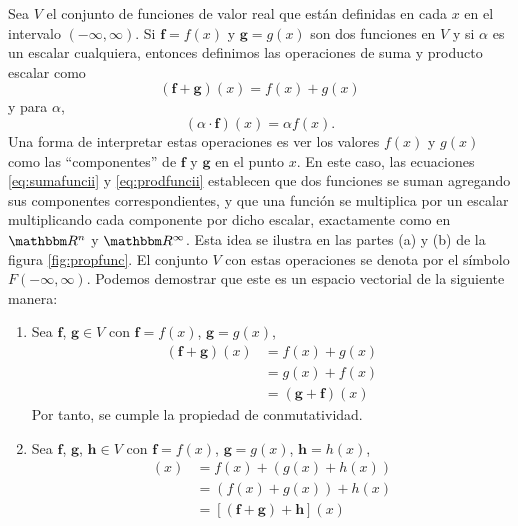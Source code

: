 \begin{examplebox}{}{}
    Sea $V$ el conjunto de funciones de valor real que están definidas en cada $x$ en el intervalo $(-\infty, \infty)$. Si $\mathbf{f} = f(x)$ y $\mathbf{g} = g(x)$ son dos funciones en $V$ y si $\alpha$ es un escalar cualquiera, entonces definimos las operaciones de suma y producto escalar como
    \begin{equation}
        (\mathbf{f} + \mathbf{g})(x) = f(x) + g(x) \label{eq:sumafuncii}
    \end{equation}
    y para $\alpha$,
    \begin{equation}
        (\alpha \cdot \mathbf{f})(x) = \alpha f(x). \label{eq:prodfuncii}
    \end{equation}
    Una forma de interpretar estas operaciones es ver los valores $f(x)$ y $g(x)$ como las “componentes” de $\mathbf{f}$ y $\mathbf{g}$ en el punto $x$. En este caso, las ecuaciones \eqref{eq:sumafuncii} y \eqref{eq:prodfuncii} establecen que dos funciones se suman agregando sus componentes correspondientes, y que una función se multiplica por un escalar multiplicando cada componente por dicho escalar, exactamente como en $\RR[n]$ y $\RR[\infty]$. Esta idea se ilustra en las partes (a) y (b) de la figura \ref{fig:propfunc}. El conjunto $V$ con estas operaciones se denota por el símbolo $F(-\infty, \infty)$. Podemos demostrar que este es un espacio vectorial de la siguiente manera:
    \begin{enumerate}[label=\roman*), topsep=6pt, itemsep=0pt]
        \item Sea $\mathbf{f}$, $\mathbf{g} \in V$ con $\mathbf{f} = f(x)$, $\mathbf{g} = g(x)$,
        \begin{align*}
            (\mathbf{f} + \mathbf{g})(x) & = f(x) + g(x) \\
            & = g(x) + f(x) \\
            & = (\mathbf{g} + \mathbf{f})(x)
        \end{align*}
        Por tanto, se cumple la propiedad de conmutatividad.
        \item Sea $\mathbf{f}$, $\mathbf{g}$, $\mathbf{h} \in V$ con $\mathbf{f} = f(x)$, $\mathbf{g} = g(x)$, $\mathbf{h} = h(x)$,
        \begin{align*}
            [\mathbf{f} + (\mathbf{g} + \mathbf{h})](x) & = f(x) + (g(x) + h(x)) \\
            & = (f(x) + g(x)) + h(x) \\
            & = [(\mathbf{f} + \mathbf{g}) + \mathbf{h}](x)
        \end{align*}

\end{enumerate}
\end{examplebox}
